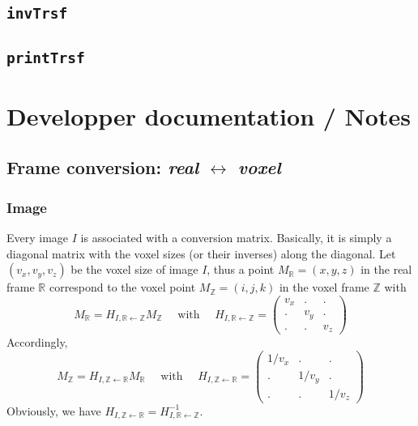 \documentclass[10pt]{report}
\def\invTrsf{\texttt{invTrsf} }
\def\printTrsf{\texttt{printTrsf} }
\begin{document}
\section{\invTrsf}

\section{\printTrsf}








\newpage
\chapter{Developper documentation / Notes}

\section{Frame conversion: \textit{real} $\leftrightarrow$ \textit{voxel}}

\subsection{Image}

Every image $I$ is associated with a conversion matrix. Basically, it is simply a diagonal matrix with the voxel sizes (or their inverses) along the diagonal. Let $(v_x, v_y, v_z)$ be the voxel size of image $I$, thus a point $M_{\mathbb{R}} = (x,y,z)$ in the real frame $\mathbb{R}$ correspond to the voxel point $M_{\mathbb{Z}} = (i,j,k)$ in the voxel frame $\mathbb{Z}$ with
$$M_{\mathbb{R}} = H_{I,\mathbb{R} \leftarrow \mathbb{Z}} M_{\mathbb{Z}}
\quad \mbox{ with } \quad
H_{I,\mathbb{R} \leftarrow \mathbb{Z}} = \left( \begin{array}{ccc}
v_x & . & . \\
. & v_y & .\\
. & . & v_z
\end{array} \right)
$$
Accordingly,
$$M_{\mathbb{Z}} = H_{I,\mathbb{Z} \leftarrow \mathbb{R}} M_{\mathbb{R}}
\quad \mbox{ with } \quad
H_{I,\mathbb{Z} \leftarrow \mathbb{R}} = \left( \begin{array}{ccc}
1/v_x & . & . \\
. & 1/v_y & .\\
. & . & 1/v_z
\end{array} \right)
$$
Obviously, we have $H_{I,\mathbb{Z} \leftarrow \mathbb{R}} = H^{-1}_{I,\mathbb{R} \leftarrow \mathbb{Z}}$.
\end{document}
